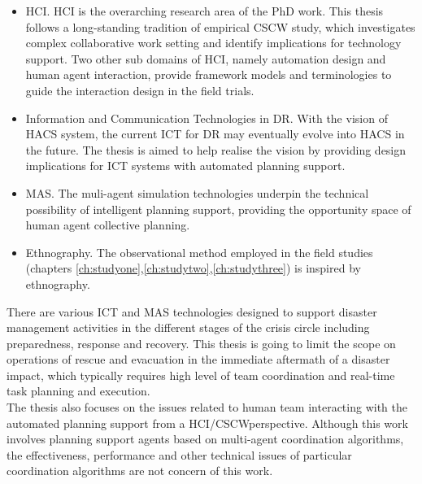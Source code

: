 \begin{itemize} 
  \item \acf{HCI}. \ac{HCI} is the overarching research area of the PhD work. This thesis follows a long-standing tradition of empirical \ac{CSCW} study, which investigates complex  collaborative work setting and identify implications for technology support. Two other sub domains of \ac{HCI}, namely automation design and human agent interaction, provide framework models and terminologies to guide the interaction design in the field trials.
  \item Information and Communication Technologies in \ac{DR}. With the vision of \ac{HACS} system, the current \ac{ICT} for \ac{DR} may eventually evolve into \ac{HACS} in the future. The thesis is aimed to help realise the vision by providing design implications for \ac{ICT} systems with automated planning support. 
  \item \acf{MAS}. The muli-agent simulation technologies underpin the technical possibility of intelligent planning support, providing the opportunity space of human agent collective planning. 
  \item Ethnography. The observational method employed in the field studies (chapters \ref{ch:studyone},\ref{ch:studytwo},\ref{ch:studythree}) is inspired by ethnography.
\end{itemize}

There are various \ac{ICT} and \ac{MAS} technologies designed to support disaster management activities in the different stages of the crisis circle including preparedness, response and recovery. This thesis is going to limit the scope on operations of rescue and evacuation in the immediate aftermath of a disaster impact, which typically requires high level of team coordination and real-time task planning and execution.\\ 

The thesis also focuses on the issues related to human team interacting with the automated planning support from a \ac{HCI}/\ac{CSCW}perspective. Although this work involves planning support agents based on multi-agent coordination algorithms, the effectiveness, performance and other technical issues of particular coordination algorithms are not concern of this work.\\


